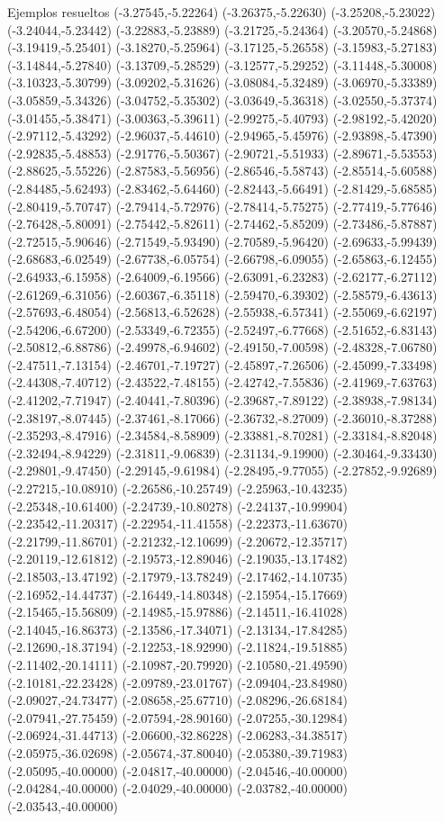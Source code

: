 \documentclass[11pt,a4paper]{article}
\begin{document}
\begin{fmex}{Ejemplos resueltos}
(-3.27545,-5.22264) (-3.26375,-5.22630) (-3.25208,-5.23022) (-3.24044,-5.23442) (-3.22883,-5.23889) (-3.21725,-5.24364) (-3.20570,-5.24868) (-3.19419,-5.25401) (-3.18270,-5.25964) (-3.17125,-5.26558) (-3.15983,-5.27183) (-3.14844,-5.27840) (-3.13709,-5.28529) (-3.12577,-5.29252) (-3.11448,-5.30008) (-3.10323,-5.30799) (-3.09202,-5.31626) (-3.08084,-5.32489) (-3.06970,-5.33389) (-3.05859,-5.34326) (-3.04752,-5.35302) (-3.03649,-5.36318) (-3.02550,-5.37374) (-3.01455,-5.38471) (-3.00363,-5.39611) (-2.99275,-5.40793) (-2.98192,-5.42020) (-2.97112,-5.43292) (-2.96037,-5.44610) (-2.94965,-5.45976) (-2.93898,-5.47390) (-2.92835,-5.48853) (-2.91776,-5.50367) (-2.90721,-5.51933) (-2.89671,-5.53553) (-2.88625,-5.55226) (-2.87583,-5.56956) (-2.86546,-5.58743) (-2.85514,-5.60588) (-2.84485,-5.62493) (-2.83462,-5.64460) (-2.82443,-5.66491) (-2.81429,-5.68585) (-2.80419,-5.70747) (-2.79414,-5.72976) (-2.78414,-5.75275) (-2.77419,-5.77646) (-2.76428,-5.80091) (-2.75442,-5.82611) (-2.74462,-5.85209) (-2.73486,-5.87887) (-2.72515,-5.90646) (-2.71549,-5.93490) (-2.70589,-5.96420) (-2.69633,-5.99439) (-2.68683,-6.02549) (-2.67738,-6.05754) (-2.66798,-6.09055) (-2.65863,-6.12455) (-2.64933,-6.15958) (-2.64009,-6.19566) (-2.63091,-6.23283) (-2.62177,-6.27112) (-2.61269,-6.31056) (-2.60367,-6.35118) (-2.59470,-6.39302) (-2.58579,-6.43613) (-2.57693,-6.48054) (-2.56813,-6.52628) (-2.55938,-6.57341) (-2.55069,-6.62197) (-2.54206,-6.67200) (-2.53349,-6.72355) (-2.52497,-6.77668) (-2.51652,-6.83143) (-2.50812,-6.88786) (-2.49978,-6.94602) (-2.49150,-7.00598) (-2.48328,-7.06780) (-2.47511,-7.13154) (-2.46701,-7.19727) (-2.45897,-7.26506) (-2.45099,-7.33498) (-2.44308,-7.40712) (-2.43522,-7.48155) (-2.42742,-7.55836) (-2.41969,-7.63763) (-2.41202,-7.71947) (-2.40441,-7.80396) (-2.39687,-7.89122) (-2.38938,-7.98134) (-2.38197,-8.07445) (-2.37461,-8.17066) (-2.36732,-8.27009) (-2.36010,-8.37288) (-2.35293,-8.47916) (-2.34584,-8.58909) (-2.33881,-8.70281) (-2.33184,-8.82048) (-2.32494,-8.94229) (-2.31811,-9.06839) (-2.31134,-9.19900) (-2.30464,-9.33430) (-2.29801,-9.47450) (-2.29145,-9.61984) (-2.28495,-9.77055) (-2.27852,-9.92689) (-2.27215,-10.08910) (-2.26586,-10.25749) (-2.25963,-10.43235) (-2.25348,-10.61400) (-2.24739,-10.80278) (-2.24137,-10.99904) (-2.23542,-11.20317) (-2.22954,-11.41558) (-2.22373,-11.63670) (-2.21799,-11.86701) (-2.21232,-12.10699) (-2.20672,-12.35717) (-2.20119,-12.61812) (-2.19573,-12.89046) (-2.19035,-13.17482) (-2.18503,-13.47192) (-2.17979,-13.78249) (-2.17462,-14.10735) (-2.16952,-14.44737) (-2.16449,-14.80348) (-2.15954,-15.17669) (-2.15465,-15.56809) (-2.14985,-15.97886) (-2.14511,-16.41028) (-2.14045,-16.86373) (-2.13586,-17.34071) (-2.13134,-17.84285) (-2.12690,-18.37194) (-2.12253,-18.92990) (-2.11824,-19.51885) (-2.11402,-20.14111) (-2.10987,-20.79920) (-2.10580,-21.49590) (-2.10181,-22.23428) (-2.09789,-23.01767) (-2.09404,-23.84980) (-2.09027,-24.73477) (-2.08658,-25.67710) (-2.08296,-26.68184) (-2.07941,-27.75459) (-2.07594,-28.90160) (-2.07255,-30.12984) (-2.06924,-31.44713) (-2.06600,-32.86228) (-2.06283,-34.38517) (-2.05975,-36.02698) (-2.05674,-37.80040) (-2.05380,-39.71983) (-2.05095,-40.00000) (-2.04817,-40.00000) (-2.04546,-40.00000) (-2.04284,-40.00000) (-2.04029,-40.00000) (-2.03782,-40.00000) (-2.03543,-40.00000) 
\end{fmex}
\end{document}

